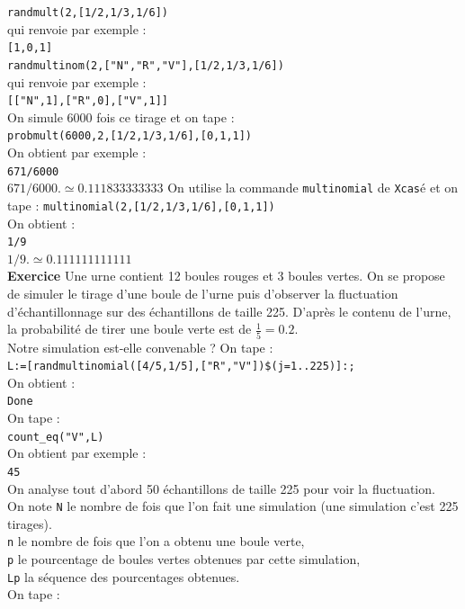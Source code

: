 \documentclass[a4paper,11pt]{book}
\begin{document}
{\tt randmult(2,[1/2,1/3,1/6])}\\
qui renvoie par exemple :\\
{\tt [1,0,1]}\\
{\tt randmultinom(2,["N","R","V"],[1/2,1/3,1/6])}\\
qui renvoie par exemple :\\
{\tt [["N",1],["R",0],["V",1]]}\\
On simule 6000 fois ce tirage et on tape :\\
{\tt probmult(6000,2,[1/2,1/3,1/6],[0,1,1])}\\
On obtient par exemple :\\
{\tt 671/6000}\\
 $671/6000. \simeq 0.111833333333$
On utilise la commande {\tt multinomial} de {\tt Xcas}é et on tape :
{\tt multinomial(2,[1/2,1/3,1/6],[0,1,1])}\\
On obtient :\\
{\tt 1/9}\\
$1/9. \simeq 0.111111111111$\\
{\bf Exercice}
 Une urne contient 12 boules rouges et 3 boules vertes.
On se propose de simuler le tirage d’une boule de l’urne puis d’observer la 
fluctuation d’échantillonnage sur des échantillons de taille 225.
D’après le contenu de l’urne, la probabilité de tirer une boule verte 
est de $\frac{1}{5}=0.2$.\\
Notre simulation est-elle convenable ?
On tape :\\
{\tt L:=[randmultinomial([4/5,1/5],["R","V"])\$(j=1..225)]:;}\\
On obtient :\\
{\tt Done}\\
On tape :\\
{\tt count\_eq("V",L)}\\
On obtient par exemple :\\
{\tt 45}\\
On analyse tout d'abord 50 \'echantillons de taille 225 pour voir la fluctuation.\\
On note {\tt N} le nombre de fois que l'on fait une simulation (une simulation
c'est 225 tirages).\\
{\tt n} le nombre de fois que l'on a obtenu une boule verte,\\
{\tt p} le  pourcentage de boules vertes obtenues par cette simulation,\\
{\tt Lp} la s\'equence des pourcentages obtenues.\\
On tape :\\
\end{document}
